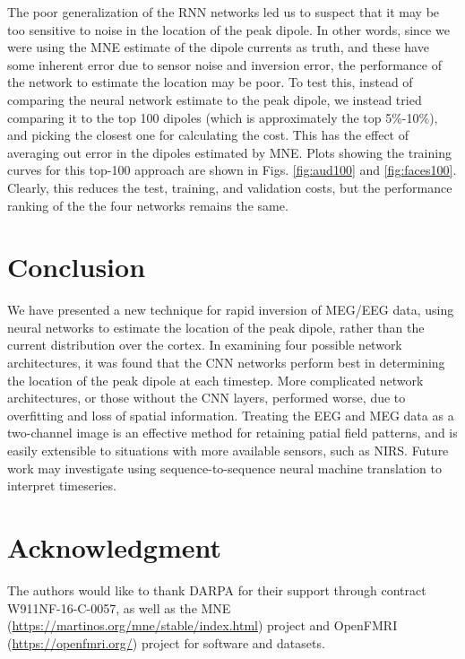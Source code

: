 \documentclass[journal]{IEEEtran}
\begin{document}
The poor generalization of the RNN networks led us to suspect that it may be too sensitive to noise in the location of the peak dipole. In other words, since we were using the MNE estimate of the dipole currents as truth, and these have some inherent error due to sensor noise and inversion error, the performance of the network to estimate the location may be poor. To test this, instead of comparing the neural network estimate to the peak dipole, we instead tried comparing it to the top 100 dipoles (which is approximately the top 5\%-10\%), and picking the closest one for calculating the cost. This has the effect of averaging out error in the dipoles estimated by MNE. Plots showing the training curves for this top-100 approach are shown in Figs. \ref{fig:aud100} and \ref{fig:faces100}. Clearly, this reduces the test, training, and validation costs, but the performance ranking of the the four networks remains the same.


\section{Conclusion}
We have presented a new technique for rapid inversion of MEG/EEG data, using neural networks to estimate the location of the peak dipole, rather than the current distribution over the cortex. In examining four possible network architectures, it was found that the CNN networks perform best in determining the location of the peak dipole at each timestep. More complicated network architectures, or those without the CNN layers, performed worse, due to overfitting and loss of spatial information. Treating the EEG and MEG data as a two-channel image is an effective method for retaining patial field patterns, and is easily extensible to situations with more available sensors, such as NIRS. Future work may investigate using sequence-to-sequence neural machine translation to interpret timeseries.


\section*{Acknowledgment}
The authors would like to thank DARPA for their support through contract W911NF-16-C-0057, as well as the MNE (\url{https://martinos.org/mne/stable/index.html}) project and OpenFMRI (\url{https://openfmri.org/}) project for software and datasets.





\end{document}
